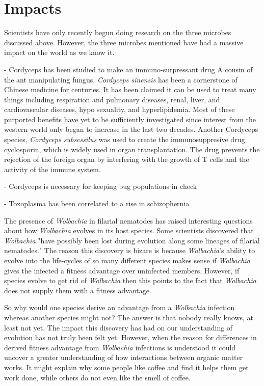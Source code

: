 \documentclass[twocolumn]{article}
\begin{document}
\section*{Impacts}

Scientists have only recently begun doing research on the three microbes discussed above. However, the three microbes mentioned have had a massive impact on the world as we know it. 

- Cordyceps has been studied to make an immuno-surpressant drug
A cousin of the ant manipulating fungus, \textit{Cordyceps sinensis} has been a cornerstone of Chinese medicine for centuries. It has been claimed it can be used to treat many things including respiration and pulmonary diseases, renal, liver, and cardiovascular diseases, hypo sexuality, and hyperlipidemia. Most of these purported benefits have yet to be sufficiently investigated since interest from the western world only began to increase in the last two decades. \cite{medicinal_cordy} Another Cordyceps species, \textit{Cordyceps subsessilus} was used to create the immunosuppresive drug cyclosporin, which is widely used in organ transplantation. The drug prevents the rejection of the foreign organ by interfering with the growth of T cells and the activity of the immune system.\cite{cordy_tcells}

- Cordyceps is necessary for keeping bug populations in check

- Toxoplasma has been correlated to a rise in schizophernia

The presence of \textit{Wolbachia} in filarial nematodes has raised interesting questions about how \textit{Wolbachia} evolves in its host species. Some scientists discovered that \textit{Wolbachia} "have possibly been lost during evolution along some lineages of filarial nematodes."\cite{Wevolution_loss} The reason this discovery is bizare is because \textit{Wolbachia}'s ability to evolve into the life-cycles of so many different species makes sense if \textit{Wolbachia} gives the infected a fitness advantage over uninfected members. However, if species evolve to get rid of \textit{Wolbachia} then this points to the fact that \textit{Wolbachia} does not supply them with a fitness advantage.

So why would one species derive an advantage from a \textit{Wolbachia} infection whereas another species might not? The answer is that nobody really knows, at least not yet. The impact this discovery has had on our understanding of evolution has not truly been felt yet. However, when the reason for differences in derived fitness advantage from \textit{Wolbachia} infections is understood it could uncover a greater understanding of how interactions between organic matter works. It might explain why some people like coffee and find it helps them get work done, while others do not even like the smell of coffee.
\end{document}
